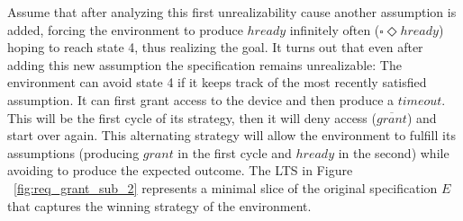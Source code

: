 Assume that after analyzing this first unrealizability cause another assumption is added, forcing the environment to produce
$hready$ infinitely often ($\square\Diamond hready$) hoping to reach state 4,
thus realizing the goal.  It turns out that even after adding this
new assumption the specification remains unrealizable:  The environment
can avoid state 4 if it keeps track of the most recently satisfied assumption.
It can first grant access to the device and then produce a $timeout$. 
This will be the first cycle of its strategy, then it will deny access
 ($\overline{grant}$) and start over again.  This alternating strategy will allow the environment
 to fulfill its assumptions (producing $grant$ in the first cycle
 and $hready$ in the second) while avoiding to produce the expected
 outcome.  The LTS in Figure
 ~\ref{fig:req_grant_sub_2} represents a minimal slice of the original specification $E$ that captures the winning strategy of the environment. 
 
 

 
